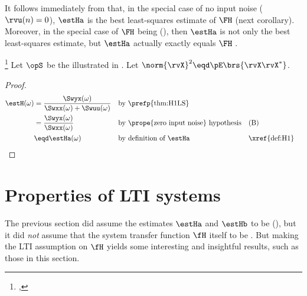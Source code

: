 It follows immediately from  that, in the special case
of no input noise ($\rvu(n)=0$), $\estHa$ is the best
least-squares estimate of $\FH$ (next corollary).
Moreover, in the special case of $\FH$ being  (),
then $\estHa$ is not only the best least-squares estimate, but $\estHa$ actually exactly equals $\FH$
.
\begin{corollary}
\footnote{
  ,
  }
\label{cor:H1LS}
Let $\opS$ be the  illustrated in .
Let $\norm{\rvX}^2\eqd\pE\brs{\rvX\rvX^\ast}$.
\end{corollary}
\begin{proof}
  \begin{align*}
    \estH(\omega)
      &= \frac{\Swyx(\omega)}{\Swxx(\omega) + \Swuu(\omega)}
      && \text{by \prefp{thm:H1LS}}
    \\&= \frac{\Swyx(\omega)}{\Swxx(\omega)}
      && \text{by \prope{zero input noise} hypothesis}
      && \text{(B)}
    \\&\eqd \estHa(\omega)
      && \text{by definition of $\estHa$}
      && \text{\xref{def:H1}}
  \end{align*}
\end{proof}

\section{Properties of LTI systems}
The previous section did assume the estimates $\estHa$ and $\estHb$  to be 
 (), but it did \emph{not} assume that 
the system transfer function $\fH$ itself to be . 
But making the LTI assumption on $\fH$ yields some interesting and insightful
results, such as those in this section.

